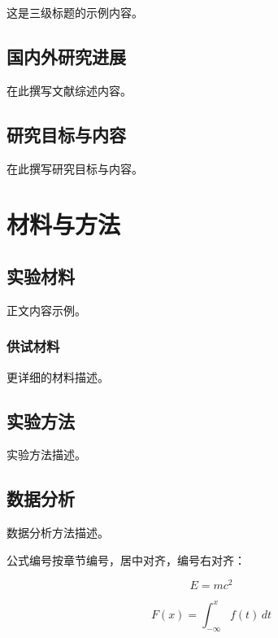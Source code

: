 \documentclass[]{CAUthesis}
\begin{document}
这是三级标题的示例内容。

\section{国内外研究进展}

在此撰写文献综述内容。

\section{研究目标与内容}

在此撰写研究目标与内容。

\chapter{材料与方法}

\section{实验材料}

正文内容示例。

\subsection{供试材料}

更详细的材料描述。

\section{实验方法}

实验方法描述。

\section{数据分析}

数据分析方法描述。

公式编号按章节编号，居中对齐，编号右对齐：

\begin{equation}
  E = mc^2
  \label{eq:einstein}
\end{equation}

\begin{equation}
  F(x) = \int_{-\infty}^{x} f(t) \, dt
  \label{eq:integral}
\end{equation}
\end{document}
